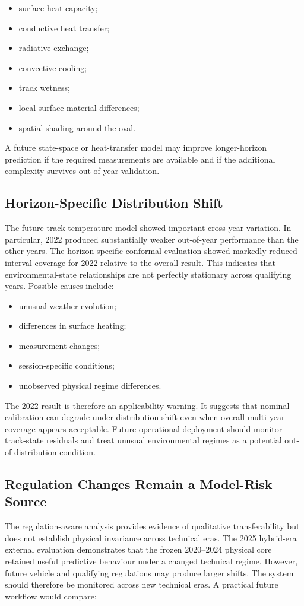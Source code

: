 \begin{itemize}
\item surface heat capacity;
\item conductive heat transfer;
\item radiative exchange;
\item convective cooling;
\item track wetness;
\item local surface material differences;
\item spatial shading around the oval.
\end{itemize}

A future state-space or heat-transfer model may improve longer-horizon prediction if the required measurements are available and if the additional complexity survives out-of-year validation.

\subsection{Horizon-Specific Distribution Shift}
The future track-temperature model showed important cross-year variation. In particular, 2022 produced substantially weaker out-of-year performance than the other years. The horizon-specific conformal evaluation showed markedly reduced interval coverage for 2022 relative to the overall result. This indicates that environmental-state relationships are not perfectly stationary across qualifying years. Possible causes include:

\begin{itemize}
\item unusual weather evolution;
\item differences in surface heating;
\item measurement changes;
\item session-specific conditions;
\item unobserved physical regime differences.
\end{itemize}

The 2022 result is therefore an applicability warning. It suggests that nominal calibration can degrade under distribution shift even when overall multi-year coverage appears acceptable. Future operational deployment should monitor track-state residuals and treat unusual environmental regimes as a potential out-of-distribution condition.

\subsection{Regulation Changes Remain a Model-Risk Source}
The regulation-aware analysis provides evidence of qualitative transferability but does not establish physical invariance across technical eras. The 2025 hybrid-era external evaluation demonstrates that the frozen 2020--2024 physical core retained useful predictive behaviour under a changed technical regime. However, future vehicle and qualifying regulations may produce larger shifts. The system should therefore be monitored across new technical eras. A practical future workflow would compare:

